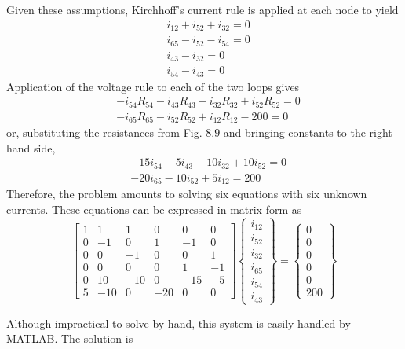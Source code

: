 \documentclass[../main.tex]{subfiles}
\begin{document}
Given these assumptions, Kirchhoff's current rule is applied at each node to yield
$$
\begin{aligned}
&i_{12}+i_{52}+i_{32}=0 \\
&i_{65}-i_{52}-i_{54}=0 \\
&i_{43}-i_{32}=0 \\
&i_{54}-i_{43}=0
\end{aligned}
$$
Application of the voltage rule to each of the two loops gives
$$
\begin{aligned}
&-i_{54} R_{54}-i_{43} R_{43}-i_{32} R_{32}+i_{52} R_{52}=0 \\
&-i_{65} R_{65}-i_{52} R_{52}+i_{12} R_{12}-200=0
\end{aligned}
$$
or, substituting the resistances from Fig. $8.9$ and bringing constants to the right-hand side,
$$
\begin{aligned}
&-15 i_{54}-5 i_{43}-10 i_{32}+10 i_{52}=0 \\
&-20 i_{65}-10 i_{52}+5 i_{12}=200
\end{aligned}
$$
Therefore, the problem amounts to solving six equations with six unknown currents. These equations can be expressed in matrix form as
$$
\left[\begin{array}{cccccc}
1 & 1 & 1 & 0 & 0 & 0 \\
0 & -1 & 0 & 1 & -1 & 0 \\
0 & 0 & -1 & 0 & 0 & 1 \\
0 & 0 & 0 & 0 & 1 & -1 \\
0 & 10 & -10 & 0 & -15 & -5 \\
5 & -10 & 0 & -20 & 0 & 0
\end{array}\right]\left\{\begin{array}{l}
i_{12} \\
i_{52} \\
i_{32} \\
i_{65} \\
i_{54} \\
i_{43}
\end{array}\right\}=\left\{\begin{array}{c}
0 \\
0 \\
0 \\
0 \\
0 \\
200
\end{array}\right\}
$$

Although impractical to solve by hand, this system is easily handled by MATLAB. The solution is
\end{document}
